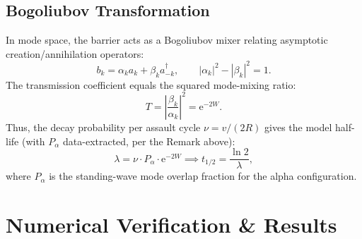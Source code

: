 \documentclass[11pt,a4paper]{article}
\theoremstyle{remark}
\newcommand{\ee}{\mathrm{e}}
\begin{document}
\subsection{Bogoliubov Transformation}
In mode space, the barrier acts as a Bogoliubov mixer relating asymptotic creation/annihilation operators:
\begin{equation}
b_k = \alpha_k a_k + \beta_k a_{-k}^\dagger, \qquad |\alpha_k|^2 - |\beta_k|^2 = 1.
\end{equation}
The transmission coefficient equals the squared mode-mixing ratio:
\begin{equation}
T = \left|\frac{\beta_k}{\alpha_k}\right|^2 = \ee^{-2W}.
\end{equation}
Thus, the decay probability per assault cycle $\nu = v/(2R)$ gives the model half-life (with $P_\alpha$ data-extracted, per the Remark above):
\begin{equation}
\lambda = \nu \cdot P_\alpha \cdot \ee^{-2W} \implies t_{1/2} = \frac{\ln 2}{\lambda},
\end{equation}
where $P_\alpha$ is the standing-wave mode overlap fraction for the alpha configuration.

\section{Numerical Verification \& Results}
\end{document}

